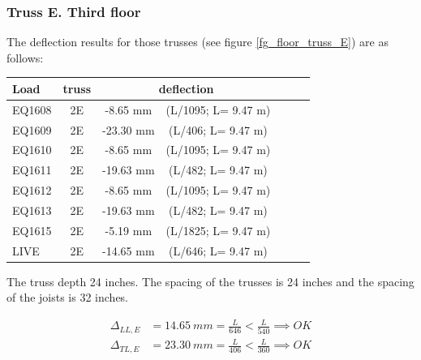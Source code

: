 \subsubsection{Truss E. Third floor}
The deflection results for those trusses (see figure \ref{fg_floor_truss_E}) are as follows:

\begin{center}
  \begin{scriptsize}
  \begin{tabular}{|l|c|c|c|c|c|c|}
    \hline
    \textbf{Load} & \textbf{truss} & \multicolumn{2}{c|}{\textbf{deflection}} \\
    \hline
EQ1608 & 2E & -8.65 mm & (L/1095; L= 9.47 m) \\
EQ1609 & 2E & -23.30 mm & (L/406; L= 9.47 m) \\
EQ1610 & 2E & -8.65 mm & (L/1095; L= 9.47 m) \\
EQ1611 & 2E & -19.63 mm & (L/482; L= 9.47 m) \\
EQ1612 & 2E & -8.65 mm & (L/1095; L= 9.47 m) \\
EQ1613 & 2E & -19.63 mm & (L/482; L= 9.47 m) \\
EQ1615 & 2E & -5.19 mm & (L/1825; L= 9.47 m) \\
LIVE & 2E & -14.65 mm & (L/646; L= 9.47 m) \\
\hline
  \end{tabular}
  \end{scriptsize}
\end{center}

\noindent The truss depth 24 inches. The spacing of the trusses is 24 inches and the spacing of the joists is 32 inches.

\begin{align}
\Delta_{LL,E} &= 14.65\ mm= \frac{L}{646} < \frac{L}{540} \implies OK \\
\Delta_{TL,E} &= 23.30\ mm= \frac{L}{406} < \frac{L}{360} \implies OK \\
\end{align}

